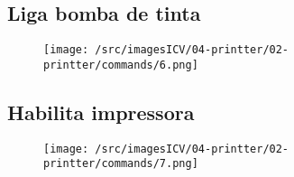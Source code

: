 \newpage
\thispagestyle{fancy}
\vspace{\fill}
\subsection{Liga bomba de tinta}
\begin{figure}
    \centering
    \texttt{[image: /src/imagesICV/04-printter/02-printter/commands/6.png]}
\end{figure}

\newpage
\thispagestyle{fancy}
\vspace{\fill}
\subsection{Habilita impressora}
\begin{figure}
    \centering
    \texttt{[image: /src/imagesICV/04-printter/02-printter/commands/7.png]}
\end{figure}

